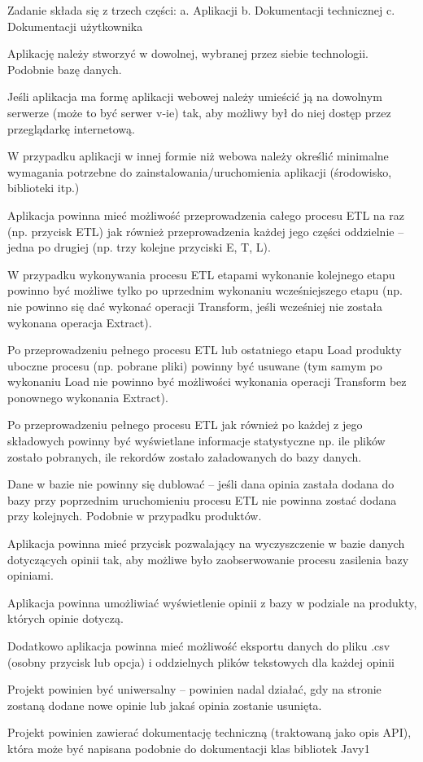 \begin{DoxyEnumerate}
\item Zadanie składa się z trzech części\+: a. Aplikacji b. Dokumentacji technicznej c. Dokumentacji użytkownika
\item Aplikację należy stworzyć w dowolnej, wybranej przez siebie technologii. Podobnie bazę danych.
\item Jeśli aplikacja ma formę aplikacji webowej należy umieścić ją na dowolnym serwerze (może to być serwer v-\/ie) tak, aby możliwy był do niej dostęp przez przeglądarkę internetową.
\item W przypadku aplikacji w innej formie niż webowa należy określić minimalne wymagania potrzebne do zainstalowania/uruchomienia aplikacji (środowisko, biblioteki itp.)
\item Aplikacja powinna mieć możliwość przeprowadzenia całego procesu E\+TL na raz (np. przycisk E\+TL) jak również przeprowadzenia każdej jego części oddzielnie – jedna po drugiej (np. trzy kolejne przyciski E, T, L).
\item W przypadku wykonywania procesu E\+TL etapami wykonanie kolejnego etapu powinno być możliwe tylko po uprzednim wykonaniu wcześniejszego etapu (np. nie powinno się dać wykonać operacji Transform, jeśli wcześniej nie została wykonana operacja Extract).
\item Po przeprowadzeniu pełnego procesu E\+TL lub ostatniego etapu Load produkty uboczne procesu (np. pobrane pliki) powinny być usuwane (tym samym po wykonaniu Load nie powinno być możliwości wykonania operacji Transform bez ponownego wykonania Extract).
\item Po przeprowadzeniu pełnego procesu E\+TL jak również po każdej z jego składowych powinny być wyświetlane informacje statystyczne np. ile plików zostało pobranych, ile rekordów zostało załadowanych do bazy danych.
\item Dane w bazie nie powinny się dublować – jeśli dana opinia zastała dodana do bazy przy poprzednim uruchomieniu procesu E\+TL nie powinna zostać dodana przy kolejnych. Podobnie w przypadku produktów.
\item Aplikacja powinna mieć przycisk pozwalający na wyczyszczenie w bazie danych dotyczących opinii tak, aby możliwe było zaobserwowanie procesu zasilenia bazy opiniami.
\item Aplikacja powinna umożliwiać wyświetlenie opinii z bazy w podziale na produkty, których opinie dotyczą.
\item Dodatkowo aplikacja powinna mieć możliwość eksportu danych do pliku .csv (osobny przycisk lub opcja) i oddzielnych plików tekstowych dla każdej opinii
\item Projekt powinien być uniwersalny – powinien nadal działać, gdy na stronie zostaną dodane nowe opinie lub jakaś opinia zostanie usunięta.
\item Projekt powinien zawierać dokumentację techniczną (traktowaną jako opis A\+PI), która może być napisana podobnie do dokumentacji klas bibliotek Javy1
\end{DoxyEnumerate}
